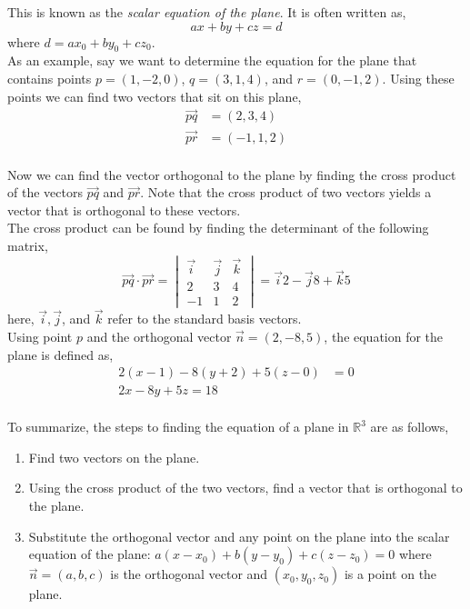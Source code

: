 \documentclass[12pt]{article}
\begin{document}
 This is known as the \emph{scalar equation of the plane}. It is often written as,
\[
ax + by + cz = d
\]
where $d = ax_0 + by_0 + cz_0$. \\

 As an example, say we want to determine the equation for the plane that contains points $p=(1,-2,0)$, $q=(3,1,4)$, and $r = (0,-1,2)$. Using these points we can find two vectors that sit on this plane,
\begin{align*}
\vec{pq} &= (2,3,4) \\
\vec{pr} &= (-1,1,2) \\
\end{align*}

Now we can find the vector orthogonal to the plane by finding the cross product of the vectors $\vec{pq}$ and $\vec{pr}$. Note that the cross product of two vectors yields a vector that is orthogonal to these vectors. \\

 The cross product can be found by finding the determinant of the following matrix,
\[
\vec{pq}\cdot\vec{pr} 
=
\begin{vmatrix}
\vec{i} & \vec{j} & \vec{k} \\
2 & 3 & 4 \\
-1 & 1 & 2
\end{vmatrix}
=
\vec{i}2-\vec{j}8+\vec{k}5
\]
here, $\vec{i},\vec{j}$, and $\vec{k}$ refer to the standard basis vectors. \\

Using point $p$ and the orthogonal vector $\vec{n}=(2,-8,5)$, the equation for the plane is defined as,
\begin{align*}
2(x-1) - 8(y+2) + 5(z-0) &= 0 \\
2x - 8y + 5z = 18 \\
\end{align*}

To summarize, the steps to finding the equation of a plane in $\mathbb{R}^3$ are as follows,
\begin{enumerate}
\item Find two vectors on the plane.
\item Using the cross product of the two vectors, find a vector that is orthogonal to the plane.
\item Substitute the orthogonal vector and any point on the plane into the scalar equation of the plane: $a(x-x_0)+b(y-y_0)+c(z-z_0)=0$ where $\vec{n}=(a,b,c)$ is the orthogonal vector and $(x_0,y_0,z_0)$ is a point on the plane. \\
\end{enumerate}
\end{document}
